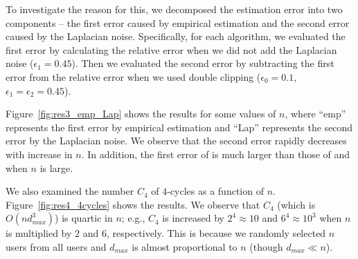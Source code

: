 To investigate the reason for this, we decomposed the estimation error into two components -- 
the first error caused by empirical estimation and the second error caused by the Laplacian noise. 
Specifically, for each algorithm, 
we evaluated the first error by calculating the relative error when we did not add the Laplacian noise ($\epsilon_1 = 0.45$). 
Then we evaluated the second error by subtracting the first error from the relative error when we used double clipping ($\epsilon_0=0.1$, $\epsilon_1 = \epsilon_2 = 0.45$). 

Figure~\ref{fig:res3_emp_Lap} shows the results for some values of $n$, where ``emp'' represents the first error by empirical estimation and ``Lap'' represents the second error by the Laplacian noise. 
We observe that the second error 
rapidly decreases with increase in $n$. 
In addition, 
the first error of \AlgOne{} is much larger than those of \AlgTwo{} and \AlgThree{} when $n$ is large. 

We also examined 
the number $C_4$ of $4$-cycles as a function of $n$. Figure~\ref{fig:res4_4cycles} shows the results. 
We observe that $C_4$ (which is $O(n d_{max}^3)$) is quartic in $n$; e.g., $C_4$ is increased by $2^4 \approx 10$ and $6^4 \approx 10^3$ when $n$ is multiplied by $2$ and $6$, respectively. 
This is because we randomly selected $n$ users from all users and $d_{max}$ is almost proportional to $n$ (though $d_{max} \ll n$). 

